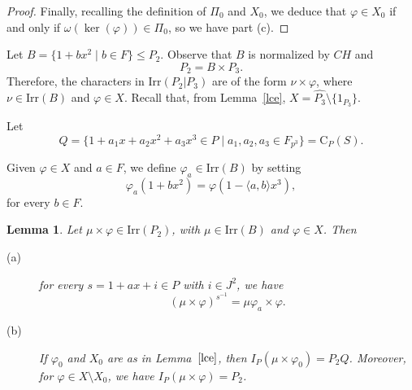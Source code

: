 \documentclass{amsart}
\newtheorem{lemma}[theorem]{Lemma}
\def\cent#1#2{\mathrm{C}_{{#1}}{{(#2)}}}
\begin{document}
\begin{proof}
Finally, recalling the definition of $\Pi_0$ and $X_0$, we deduce that  $\varphi \in X_0$ if and only if  $\omega(\ker(\varphi)) \in \Pi_0$, so we have part (c).
\end{proof}

Let $B=\{1+b x^2\mid b\in F\} \leq  P_2$. Observe that $B$ is normalized by $CH$ and $$P_2=B\times P_3.$$
Therefore, the characters in $\mathrm{Irr}(P_2| P_3)$ are of the form $\nu\times \varphi$, where $\nu\in\mathrm{Irr}(B)$ and $\varphi\in X$. Recall that, from Lemma~\ref{lce}, $X = \widehat{P_3}\setminus\{1_{P_3}\}$.

Let
$$Q=\{1+a_1 x+a_2x^2+a_3x^3\in P\mid a_1,a_2,a_3\in F_{p^3}\} = \cent PS.$$

Given $\varphi\in X$ and $a\in F$, we define $\varphi_a\in\mathrm{Irr}(B)$ by setting
\begin{equation}\label{eq:def}\varphi_a(1+b x^2)=\varphi(1 -\langle a,b\rangle x^3),\end{equation}
for every $b\in F$.

\begin{lemma}\label{lemma:tech2}
  Let $\mu\times \varphi\in\mathrm{Irr}(P_2)$, with $\mu\in\mathrm{Irr}(B)$ and $\varphi\in X$. Then
  \begin{description}
  \item[(a)]   for every $s=1+a x+i\in P$ with $i\in J^2$, we have
$$(\mu\times \varphi)^{s^{-1}}=\mu\varphi_a\times \varphi.$$

\item[(b)] If $\varphi_0$ and $X_0$ are as in Lemma~$\ref{lce}$, then $I_P(\mu\times \varphi_0) = P_2 Q$. Moreover,  for
  $\varphi  \in X \setminus X_0$, we have $I_P(\mu\times \varphi) = P_2$.
  \end{description}
\end{lemma}
\end{document}
